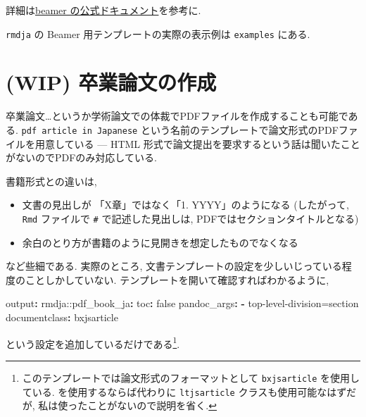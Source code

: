 \documentclass[
]{bxjsbook}
\newenvironment{Shaded}{\begin{snugshade}}{\end{snugshade}}
\newcommand{\AttributeTok}[1]{\textcolor[rgb]{0.77,0.63,0.00}{#1}}
\newcommand{\CharTok}[1]{\textcolor[rgb]{0.31,0.60,0.02}{#1}}
\newcommand{\FunctionTok}[1]{\textcolor[rgb]{0.00,0.00,0.00}{#1}}
\newcommand{\KeywordTok}[1]{\textcolor[rgb]{0.13,0.29,0.53}{\textbf{#1}}}
\newcommand{\StringTok}[1]{\textcolor[rgb]{0.31,0.60,0.02}{#1}}
\providecommand{\tightlist}{%
  \setlength{\itemsep}{0pt}\setlength{\parskip}{0pt}}
\theoremstyle{definition}
\theoremstyle{definition}
\theoremstyle{definition}
\theoremstyle{remark}
\begin{document}
詳細は\href{http://tug.ctan.org/macros/latex/contrib/beamer/doc/beameruserguide.pdf}{beamer
の公式ドキュメント}を参考に.

\texttt{rmdja} の Beamer 用テンプレートの実際の表示例は
\texttt{examples} にある.

\hypertarget{wip-ux5352ux696dux8ad6ux6587ux306eux4f5cux6210}{%
\section{(WIP)
卒業論文の作成}\label{wip-ux5352ux696dux8ad6ux6587ux306eux4f5cux6210}}

卒業論文\ldots というか学術論文での体裁でPDFファイルを作成することも可能である.
\texttt{pdf\ article\ in\ Japanese}
という名前のテンプレートで論文形式のPDFファイルを用意している --- HTML
形式で論文提出を要求するという話は聞いたことがないのでPDFのみ対応している.

書籍形式との違いは,

\begin{itemize}
\tightlist
\item
  文書の見出しが 「X章」ではなく「1. YYYY」のようになる (したがって,
  \texttt{Rmd} ファイルで \texttt{\#} で記述した見出しは,
  PDFではセクションタイトルとなる)
\item
  余白のとり方が書籍のように見開きを想定したものでなくなる
\end{itemize}

など些細である. 実際のところ,
文書テンプレートの設定を少しいじっている程度のことしかしていない.
テンプレートを開いて確認すればわかるように,

\begin{Shaded}
\begin{Highlighting}[]
\FunctionTok{output}\KeywordTok{:}
\AttributeTok{  rmdja:}\FunctionTok{:pdf\_book\_ja}\KeywordTok{:}
\AttributeTok{    }\FunctionTok{toc}\KeywordTok{:}\AttributeTok{ }\CharTok{false}
\AttributeTok{    }\FunctionTok{pandoc\_args}\KeywordTok{:}
\AttributeTok{      }\KeywordTok{{-}}\AttributeTok{ }\StringTok{\textquotesingle{}{-}{-}top{-}level{-}division=section\textquotesingle{}}
\FunctionTok{documentclass}\KeywordTok{:}\AttributeTok{ bxjsarticle}
\end{Highlighting}
\end{Shaded}

という設定を追加しているだけである\footnote{このテンプレートでは論文形式のフォーマットとして
  \texttt{bxjsarticle} を使用している.
  \LuaLaTeX を使用するならば代わりに \texttt{ltjsarticle}
  クラスも使用可能なはずだが, 私は使ったことがないので説明を省く.}.
\end{document}
